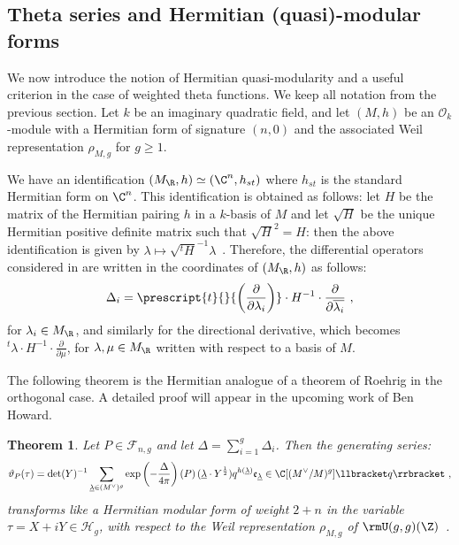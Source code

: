\documentclass[11pt,letterpaper,english]{amsart}
\numberwithin{equation}{subsection}
\numberwithin{equation}{section}
\newcommand\cF{{\mathcal F}}
\theoremstyle{plain}
\newtheorem{theorem}{Theorem}[section]
\theoremstyle{remark}
\newcommand{\salim}[1]{{\color{Purple} \sf  Salim: [#1]}}
\begin{document}
\subsection{Theta series and Hermitian (quasi)-modular forms}\label{s:quasi-modular}

We now introduce the notion of Hermitian quasi-modularity and a useful criterion in the case of weighted theta functions. We keep all notation from the previous section. 
Let $k$ be an imaginary quadratic field, and let $(M,h)$ be an $\mathcal{O}_k$-module with a Hermitian form of signature $(n,0)$ and the associated Weil representation $\rho_{M,g}$ for $g\geq 1$. 


We have an identification $(M_\R,h)\simeq (\C^n,h_{st})$ where $h_{st}$ is the standard Hermitian form on $\C^n$. This identification is obtained as follows: let $H$ be the matrix of the Hermitian pairing $h$ in a $k$-basis of $M$ and let $\sqrt{H}$ be the unique Hermitian positive definite matrix such that $\sqrt{H}^2=H$: then the above identification is given by $\lambda\mapsto \sqrt{^t H}^{-1}\lambda$~. Therefore, the differential operators considered in  are written in the coordinates of $(M_\R,h)$ as follows: 
\[\Delta_i= \prescript{t}{}{\left(\frac{\partial}{\partial \lambda_i}\right)}\cdot H^{-1}\cdot \frac{\partial}{\partial \overline{\lambda_i}}~,\]
 for $\lambda_i\in M_\R$, and similarly for the directional derivative, which becomes $^t\lambda\cdot H^{-1}\cdot\frac{\partial }{\partial \mu}$, for $\lambda,\mu\in M_\R$ written with respect to a basis of $M$. 
 
 The following theorem is the Hermitian analogue of a theorem of Roehrig \cite{roehrig} in the orthogonal case. A detailed proof will appear in the upcoming work of Ben Howard.

\begin{theorem}\label{th:shimura}
    Let $P\in \cF_{n,g}$ and let  $\Delta=\sum_{i=1}^g{\Delta_i}$. Then the generating series: 
    \[\vartheta_P(\tau)=\det(Y)^{-1}\sum_{\underline{\lambda}\in (M^\vee)^g }\exp \left(-\frac{\Delta}{4\pi}\right)\left(P\right)(\underline{\lambda}\cdot Y^{\frac{1}{2}})q^{h(\underline{\lambda})}\mathfrak e_{\underline \lambda}\in \C[(M^\vee/M)^g]\llbracket q \rrbracket~,\]
    transforms like a Hermitian modular form of weight $2+n$ in the variable $\tau=X+iY\in \mathcal{H}_g$, with respect to the Weil representation $\rho_{M,g}$ of  $\rmU(g,g)(\Z)$~. 
\end{theorem}
\end{document}
